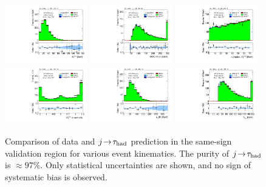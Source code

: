 \begin{figure}[tp]
  \includegraphics[width=0.32\textwidth]{figures/analysis/vbf-SSXCR/met-pt-hi}
  \includegraphics[width=0.32\textwidth]{figures/analysis/vbf-SSXCR/mMMC}
  \includegraphics[width=0.32\textwidth]{figures/analysis/vbf-SSXCR/mT}
  \includegraphics[width=0.32\textwidth]{figures/analysis/vbf-SSXCR/met-phi-centrality}
  \includegraphics[width=0.32\textwidth]{figures/analysis/vbf-SSXCR/H-pt-hi}
  \includegraphics[width=0.32\textwidth]{figures/analysis/vbf-SSXCR/mvis}
  \caption{Comparison of data and $j\!\rightarrow\!\tau_\text{had}$ prediction in the same-sign validation region for various event kinematics. The purity of $j\!\rightarrow\!\tau_\text{had}$ is $\approx\! 97\%$. Only statistical uncertainties are shown, and no sign of systematic bias is observed.}
  \label{fig:backgrounds-SSXCR-taus}
\end{figure}

